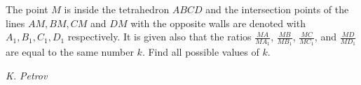 The point $M$ is inside the tetrahedron $ABCD$ and the intersection points of the lines $AM,BM,CM$ and $DM$ with the opposite walls are denoted with $A_1,B_1,C_1,D_1$ respectively. It is given also that the ratios $\frac{MA}{MA_1}$, $\frac{MB}{MB_1}$, $\frac{MC}{MC_1}$, and $\frac{MD}{MD_1}$ are equal to the same number $k$. Find all possible values of $k$.

\textit{K. Petrov}